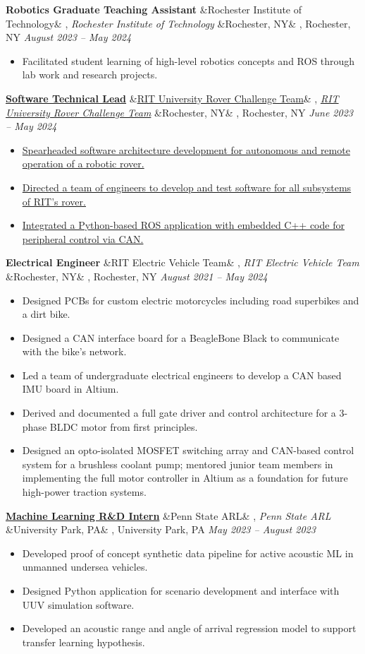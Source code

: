 \documentclass[letterpaper,10pt]{article}
\newcommand{\experience}[5]{%
    \vspace{-1mm}%
    \noindent\textbf{#1}%
    \ifx&#2&
    \else
        , \textit{#2}%
    \fi
    \ifx&#3&
    \else
        , #3%
    \fi
    \hfill \textit{#4} \\
    \vspace{-6.8mm}%
    \begin{itemize}[itemsep=-5pt]
        \setlength{\itemindent}{0em}
        #5
    \end{itemize}
}
\begin{document}
\experience
    {Robotics Graduate Teaching Assistant}
    {Rochester Institute of Technology}
    {Rochester, NY}
    {August 2023 – May 2024}
    {
        \item  Facilitated student learning of high-level robotics concepts and ROS through lab work and research projects.
    }

\experience
    {\href{https://github.com/ryan-barry-99/rovers}{Software Technical Lead}}
    {\href{https://github.com/ryan-barry-99/rovers}{RIT University Rover Challenge Team}}
    {Rochester, NY}
    {June 2023 – May 2024}
    {
        \item \href{https://github.com/ryan-barry-99/rovers}{Spearheaded software architecture development for autonomous and remote operation of a robotic rover.}

        \item \href{https://github.com/ryan-barry-99/rovers}{Directed a team of engineers to develop and test software for all subsystems of RIT’s rover.}

        \item \href{https://github.com/ryan-barry-99/rovers}{Integrated a Python-based ROS application with embedded C++ code for peripheral control via CAN.}
    }

\experience
    {Electrical Engineer}
    {RIT Electric Vehicle Team}
    {Rochester, NY}
    {August 2021 – May 2024}
    {
        \item Designed PCBs for custom electric motorcycles including road superbikes and a dirt bike.
        \item Designed a CAN interface board for a BeagleBone Black to communicate with the bike's network.
        \item Led a team of undergraduate electrical engineers to develop a CAN based IMU board in Altium.
        \item Derived and documented a full gate driver and control architecture for a 3-phase BLDC motor from first principles.
        \item Designed an opto-isolated MOSFET switching array and CAN-based control system for a brushless coolant pump; mentored junior team members in implementing the full motor controller in Altium as a foundation for future high-power traction systems.

    }

\experience
    {\href{https://ryanbarry.me/projects/ai-ml/sonar-data-pipeline/}{Machine Learning R\&D Intern}}
    {Penn State ARL}
    {University Park, PA}
    {May 2023 – August 2023}
    {
        \item Developed proof of concept synthetic data pipeline for active acoustic ML in unmanned undersea vehicles.

        \item Designed Python application for scenario development and interface with UUV simulation software.

        \item Developed an acoustic range and angle of arrival regression model to support transfer learning hypothesis.
    }
\end{document}
